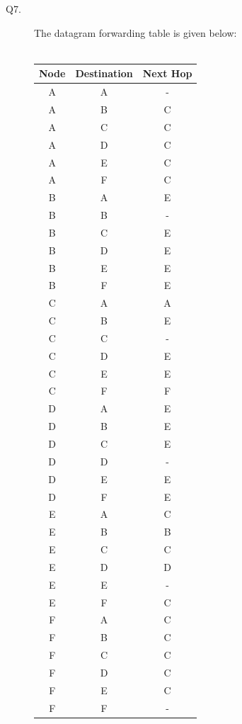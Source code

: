 \documentclass{csc_assignment}
\begin{document}
\begin{description}
\newpage
\item[Q7.]
The datagram forwarding table is given below: \\\\
\begin{tabular}{ |c|c|c| }
\hline
	Node & Destination & Next Hop \\
	\hline
	A & A & - \\
	A & B & C \\
	A & C & C \\
	A & D & C \\
	A & E & C \\
	A & F & C \\
	\hline
	B & A & E \\
	B & B & - \\
	B & C & E \\
	B & D & E \\
	B & E & E \\
	B & F & E \\
	\hline
	C & A & A \\
	C & B & E \\
	C & C & - \\
	C & D & E \\
	C & E & E \\
	C & F & F \\
	\hline
	D & A & E \\
	D & B & E \\
	D & C & E \\
	D & D & - \\
	D & E & E \\
	D & F & E \\
	\hline
	E & A & C \\
	E & B & B \\
	E & C & C \\
	E & D & D \\
	E & E & - \\
	E & F & C \\
	\hline
	F & A & C \\
	F & B & C \\
	F & C & C \\
	F & D & C \\
	F & E & C \\
	F & F & - \\
	\hline
\end{tabular} \\



\end{description}
\end{document}
